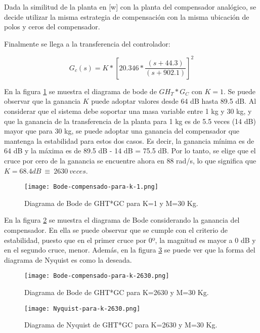 \noindent Dada la similitud de la planta en [w] con la planta del compensador analógico, se decide utilizar la misma estrategia de compensación con la misma ubicación de polos y ceros del compensador.	

\noindent Finalmente se llega a la transferencia del controlador:


 \begin{equation}  
 	G_c(s)=K*{[20.346*\frac{(s+44.3)}{(s+902.1)}]}^2
 \end{equation} 
 


\noindent En la figura \ref{fig:bode-compensado-para-k-1} se muestra el diagrama de bode de ${GH}_T*G_C$ con $K=1$. Se puede observar que la ganancia $K$ puede adoptar valores desde 64 dB hasta 89.5 dB. Al considerar que el sistema debe soportar una masa variable entre 1 kg y 30 kg, y que la ganancia de la transferencia de la planta para 1 kg es de 5.5 veces (14 dB) mayor que para 30 kg, se puede adoptar una ganancia del compensador que mantenga la estabilidad para estos dos casos. Es decir, la ganancia m\'{i}nima es de 64 dB y la m\'{a}xima es de 89.5 dB - 14 dB = 75.5 dB. Por lo tanto, se elige que el cruce por cero de la ganancia se encuentre ahora en 88 rad/s, lo que significa que $K=68.4dB\ \equiv \ 2630\ veces$.


\begin{figure}[H]
	\centering
	\texttt{[image: Bode-compensado-para-k-1.png]}
	\caption{Diagrama de Bode de GHT*GC para K=1 y M=30 Kg.}
	\label{fig:bode-compensado-para-k-1}
\end{figure}


\noindent En la figura \ref{fig:bode-compensado-para-k-2630} se muestra el diagrama de Bode considerando la ganancia del compensador. En ella se puede observar que se  cumple con el criterio de estabilidad, puesto que en el primer cruce por 0º, la magnitud es mayor a 0 dB y en el segundo cruce, menor. Adem\'{a}s, en la figura \ref{fig:nyquist-para-k-2630} se puede ver que la forma del diagrama de Nyquist es como la deseada.

\begin{figure}[H]
	\centering
	\texttt{[image: Bode-compensado-para-k-2630.png]}
	\caption{Diagrama de Bode de GHT*GC para K=2630 y M=30 Kg.}
	\label{fig:bode-compensado-para-k-2630}
\end{figure}

\begin{figure}[H]
	\centering
	\texttt{[image: Nyquist-para-k-2630.png]}
	\caption{Diagrama de Nyquist de GHT*GC para K=2630 y M=30 Kg.}
	\label{fig:nyquist-para-k-2630}
\end{figure}


